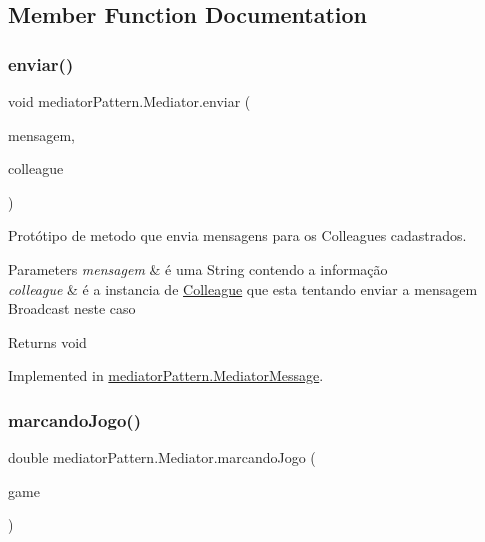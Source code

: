\subsection{Member Function Documentation}
\mbox{\label{interfacemediator_pattern_1_1_mediator_aa65168a13dac30a0e6becf57997b5cb8}} 
\subsubsection{\texorpdfstring{enviar()}{enviar()}}
{\footnotesize\ttfamily void mediator\+Pattern.\+Mediator.\+enviar (\begin{DoxyParamCaption}\item[{String}]{mensagem,  }\item[{\mbox{\hyperlink{classmediator_pattern_1_1_colleague}{Colleague}}}]{colleague }\end{DoxyParamCaption})}



Protótipo de metodo que envia mensagens para os Colleagues cadastrados. 


\begin{DoxyParams}{Parameters}
{\em mensagem} & é uma String contendo a informação \\
\hline
{\em colleague} & é a instancia de \mbox{\hyperlink{classmediator_pattern_1_1_colleague}{Colleague}} que esta tentando enviar a mensagem Broadcast neste caso \\
\hline
\end{DoxyParams}
\begin{DoxyReturn}{Returns}
void 
\end{DoxyReturn}


Implemented in \mbox{\hyperlink{classmediator_pattern_1_1_mediator_message_a33d287de4248954e4a9bfeaf8f1de626}{mediator\+Pattern.\+Mediator\+Message}}.

\mbox{\label{interfacemediator_pattern_1_1_mediator_a93da9c7e1478883a0655796d88b7ee62}} 
\subsubsection{\texorpdfstring{marcandoJogo()}{marcandoJogo()}}
{\footnotesize\ttfamily double mediator\+Pattern.\+Mediator.\+marcando\+Jogo (\begin{DoxyParamCaption}\item[{\mbox{\hyperlink{classtemplate_pattern_1_1soccer_game}{soccer\+Game}}}]{game }\end{DoxyParamCaption})}



